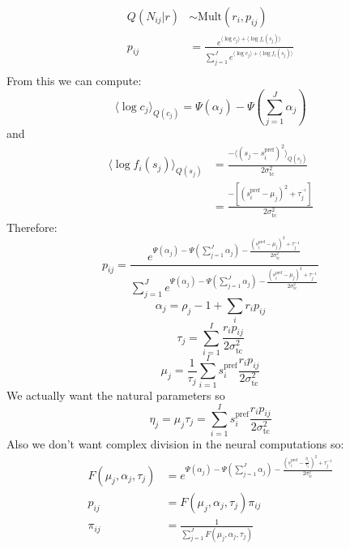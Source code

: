 \documentclass[12pt]{article}
\begin{document}
\begin{equation}
\begin{aligned}
Q(N_{ij}|r) &\sim \text{Mult}(r_i, p_{ij})\\
p_{ij} &= \frac{e^{\langle \log c_j \rangle + \langle \log f_i(s_j) \rangle}}{\sum_{j=1}^J e^{\langle \log c_j \rangle + \langle \log f_i(s_j) \rangle}}\\
\end{aligned}
\end{equation}
From this we can compute:
\begin{equation}
\langle \log c_j \rangle_{Q(c_j)}= \Psi(\alpha_j) - \Psi(\sum_{j=1}^J \alpha_j)
\end{equation}
and
\begin{equation}
\begin{aligned}
\langle \log f_i(s_j) \rangle_{Q(s_j)} &= \frac{-\langle (s_j - s_i^{\text{pref}})^2 \rangle_{Q(s_j)}}{2 \sigma_{\text{tc}}^2}\\
&=  \frac{-[(s_i^{\text{pref}} - \mu_j)^2 + \tau_j^{^{-1}}]}{2 \sigma_{\text{tc}}^2}
\end{aligned}
\end{equation}
Therefore: 
\begin{equation}
p_{ij} = \frac{e^{\Psi(\alpha_j) - \Psi(\sum_{j=1}^J \alpha_j) - \frac{(s_i^{\text{pref}} - \mu_j)^2 + \tau_j^{-1}}{2 \sigma_{\text{tc}}^2}}}{\sum_{j=1}^J e^{\Psi(\alpha_j) - \Psi(\sum_{j=1}^J \alpha_j) - \frac{(s_i^{\text{pref}} - \mu_j)^2 + \tau_j^{-1}}{2 \sigma_{\text{tc}}^2}}}
\end{equation}
\begin{equation}
\alpha_j = \rho_j - 1 + \sum_i r_i p_{ij}
\end{equation}
\begin{equation}
\tau_j = \sum_{i=1}^I \frac{r_i p_{ij}}{2 \sigma_{\text{tc}}^2}
\end{equation}
\begin{equation}
\mu_j = \frac{1}{\tau_j} \sum_{i=1}^I s_i^{\text{pref}} \frac{r_i p_{ij}}{2 \sigma_{\text{tc}}^2}
\end{equation}
We actually want the natural parameters so 
\begin{equation}
\eta_j = \mu_j \tau_j = \sum_{i=1}^I s_i^{\text{pref}} \frac{r_i p_{ij}}{2 \sigma_{\text{tc}}^2}
\end{equation}
Also we don't want complex division in the neural computations so:
\begin{equation}
\begin{aligned}
F(\mu_j, \alpha_j, \tau_j) &= e^{\Psi(\alpha_j) - \Psi(\sum_{j=1}^J \alpha_j) - \frac{(s_i^{\text{pref}} - \frac{\eta_j}{\tau_j})^2 + \tau_j^{-1}}{2 \sigma_{\text{tc}}^2}}\\
p_{ij} &= F(\mu_j, \alpha_j, \tau_j) \pi_{ij}\\
\pi_{ij} &= \frac{1}{\sum_{j=1}^J F(\mu_j, \alpha_j, \tau_j)}
\end{aligned}
\end{equation}
\end{document}
